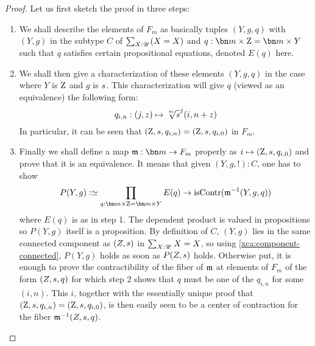 \begin{proof}
  Let us first sketch the proof in three steps:
  \begin{enumerate}[label={\sc Step \arabic*}.]
  \item We shall describe the elements of $F_m$ as basically tuples
    $(Y,g,q)$ with $(Y,g)$ in the subtype $C$ of $\sum_{X:{\mathscr{U}}}(X=X)$
    and $q:\bn m\times \zet = \bn m\times Y$ such that $q$ satisfies
    certain propositional equations, denoted $E(q)$ here.
  \item We shall then give a characterization of these elements
    $(Y,g,q)$ in the case where $Y$ is $\mathrm{Z}$ and $g$ is ${s}$. This characterization will give $q$ (viewed as an equivalence)
    the following form:
    \begin{displaymath}
      q_{i,n}: (j,z) \mapsto {\sqrt[\uproot{2}m]s}^j(i,n+z)
    \end{displaymath}
    In particular, it can be seen that
    $(\mathrm{Z},{s},q_{i,n}) = (\mathrm{Z},{s},q_{i,0})$ in $F_m$.
  \item Finally we shall define a map $\myq: \bn m \to F_m$ properly
    as $i\mapsto (\mathrm{Z},{s},q_{i,0})$ and prove that it is an
    equivalence. It means that given $(Y,g,!):C$, one has to show
    \begin{displaymath}
      P(Y,g) \defequi \prod_{q:\bn m \times \zet = \bn m \times Y}E(q)\to\iscontr(\inv{\myq}(Y,g,q))
    \end{displaymath}
    where $E(q)$ is as in step 1. The dependent product is valued in
    propositions so $P(Y,g)$ itself is a proposition. By definition of
    $C$, $(Y,g)$ lies in the same connected component as $(Z,{s})$
    in $\sum_{X:{\mathscr{U}}}X=X$, so using \cref{xca:component-connected},
    $P(Y,g)$ holds as soon as $P(Z,{s})$ holds. Otherwise put, it
    is enough to prove the contractibility of the fiber of $\mathfrak m$ at
    elements of $F_m$ of the form $(Z,{s},q)$ for which step 2
    shows that $q$ must be one of the $q_{i,n}$ for some $(i,n)$. This
    $i$, together with the essentially unique proof that
    $(\mathrm{Z},{s}, q_{i,n}) = (\mathrm{Z},{s}, q_{i,0})$, is then
    easily seen to be a center of contraction for the fiber
    $\mathfrak m^{-1}(Z,{s}, q)$.
  \end{enumerate}


\end{proof}
